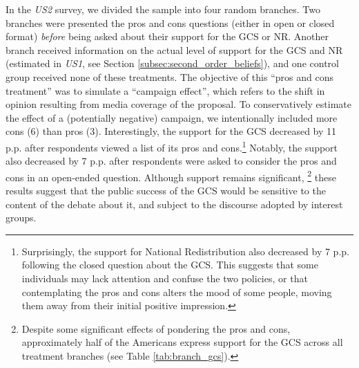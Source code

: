 In the \textit{US2} survey, we divided the sample into four random branches. Two branches were presented the pros and cons questions (either in open or closed format) \textit{before} being asked about their support for the GCS or NR. Another branch received information on the actual level of support for the GCS and NR (estimated in \textit{US1}, see Section \ref{subsec:second_order_beliefs}), and one control group received none of these treatments. %
The objective of this ``pros and cons treatment'' was to simulate a ``campaign effect'', which refers to the shift in opinion resulting from media coverage of the proposal. To conservatively estimate the effect of a (potentially negative) campaign, we intentionally included more cons (6) than pros (3). Interestingly, the support for the GCS decreased by 11 p.p. after respondents viewed a list of its pros and cons.\footnote{Surprisingly, the support for National Redistribution also decreased by 7 p.p. following the closed question about the GCS. This suggests that some individuals may lack attention and confuse the two policies, or that contemplating the pros and cons alters the mood of some people, moving them away from their initial positive impression.} Notably, the support also decreased by 7 p.p. after respondents were asked to consider the pros and cons in an open-ended question. Although support remains significant,%
\footnote{Despite some significant effects of pondering the pros and cons, approximately half of the Americans express support for the GCS across all treatment branches (see Table \ref{tab:branch_gcs}).} these results suggest that the public success of the GCS would be sensitive to the content of the debate about it, and subject to the discourse adopted by interest groups. %



